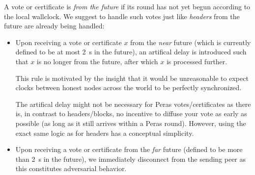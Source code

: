 A vote or certificate is \emph{from the future} if its round has not yet begun according to the local wallclock.
We suggest to handle such votes just like \emph{headers} from the future are already being handled:
\begin{itemize}
\item
  Upon receiving a vote or certificate $x$ from the \emph{near} future (which is currently defined to be at most \qty{2}{\s} in the future), an artifical delay is introduced such that $x$ is no longer from the future, after which $x$ is processed further.

  This rule is motivated by the insight that it would be unreasonable to expect clocks between honest nodes across the world to be perfectly synchronized.

  The artifical delay might not be necessary for Peras votes/certificates as there is, in contrast to headers/blocks, no incentive to diffuse your vote as early as possible (as long as it still arrives within a Peras round).
  However, using the exact same logic as for headers has a conceptual simplicity.
\item
  Upon receiving a vote or certificate from the \emph{far} future (defined to be more than \qty{2}{\s} in the future), we immediately disconnect from the sending peer as this constitutes adversarial behavior.
\end{itemize}


